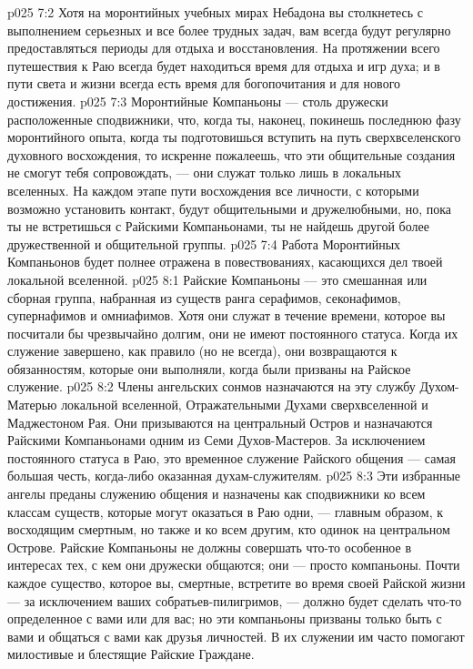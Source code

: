 \vs p025 7:2 Хотя на моронтийных учебных мирах Небадона вы столкнетесь с выполнением серьезных и все более трудных задач, вам всегда будут регулярно предоставляться периоды для отдыха и восстановления. На протяжении всего путешествия к Раю всегда будет находиться время для отдыха и игр духа; и в пути света и жизни всегда есть время для богопочитания и для нового достижения.
\vs p025 7:3 Моронтийные Компаньоны --- столь дружески расположенные сподвижники, что, когда ты, наконец, покинешь последнюю фазу моронтийного опыта, когда ты подготовишься вступить на путь сверхвселенского духовного восхождения, то искренне пожалеешь, что эти общительные создания не смогут тебя сопровождать, --- они служат только лишь в локальных вселенных. На каждом этапе пути восхождения все личности, с которыми возможно установить контакт, будут общительными и дружелюбными, но, пока ты не встретишься с Райскими Компаньонами, ты не найдешь другой более дружественной и общительной группы.
\vs p025 7:4 Работа Моронтийных Компаньонов будет полнее отражена в повествованиях, касающихся дел твоей локальной вселенной.
\vs p025 8:1 Райские Компаньоны --- это смешанная или сборная группа, набранная из существ ранга серафимов, секонафимов, супернафимов и омниафимов. Хотя они служат в течение времени, которое вы посчитали бы чрезвычайно долгим, они не имеют постоянного статуса. Когда их служение завершено, как правило (но не всегда), они возвращаются к обязанностям, которые они выполняли, когда были призваны на Райское служение.
\vs p025 8:2 Члены ангельских сонмов назначаются на эту службу Духом\hyp{}Матерью локальной вселенной, Отражательными Духами сверхвселенной и Маджестоном Рая. Они призываются на центральный Остров и назначаются Райскими Компаньонами одним из Семи Духов\hyp{}Мастеров. За исключением постоянного статуса в Раю, это временное служение Райского общения --- самая большая честь, когда\hyp{}либо оказанная духам\hyp{}служителям.
\vs p025 8:3 Эти избранные ангелы преданы служению общения и назначены как сподвижники ко всем классам существ, которые могут оказаться в Раю одни, --- главным образом, к восходящим смертным, но также и ко всем другим, кто одинок на центральном Острове. Райские Компаньоны не должны совершать что\hyp{}то особенное в интересах тех, с кем они дружески общаются; они --- просто компаньоны. Почти каждое существо, которое вы, смертные, встретите во время своей Райской жизни --- за исключением ваших собратьев\hyp{}пилигримов, --- должно будет сделать что\hyp{}то определенное с вами или для вас; но эти компаньоны призваны только быть с вами и общаться с вами как друзья личностей. В их служении им часто помогают милостивые и блестящие Райские Граждане.

